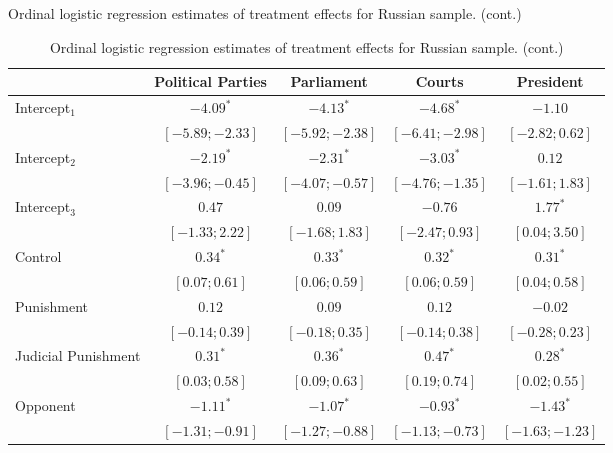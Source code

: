 \begin{table}[h]
\begin{center}
\caption
*
{Ordinal logistic regression estimates of treatment effects for Russian sample. (cont.)}
\caption{Ordinal logistic regression estimates of treatment effects for Russian sample. (cont.)}
\begin{threeparttable}
\begin{tabular}{l c c c c}
\hline
 & Political Parties & Parliament & Courts & President \\
\hline
Intercept$_1$            & $-4.09^{*}$       & $-4.13^{*}$       & $-4.68^{*}$       & $-1.10$           \\
                         & $ [-5.89; -2.33]$ & $ [-5.92; -2.38]$ & $ [-6.41; -2.98]$ & $ [-2.82;  0.62]$ \\
Intercept$_2$            & $-2.19^{*}$       & $-2.31^{*}$       & $-3.03^{*}$       & $0.12$            \\
                         & $ [-3.96; -0.45]$ & $ [-4.07; -0.57]$ & $ [-4.76; -1.35]$ & $ [-1.61;  1.83]$ \\
Intercept$_3$            & $0.47$            & $0.09$            & $-0.76$           & $1.77^{*}$        \\
                         & $ [-1.33;  2.22]$ & $ [-1.68;  1.83]$ & $ [-2.47;  0.93]$ & $ [ 0.04;  3.50]$ \\
Control                  & $0.34^{*}$        & $0.33^{*}$        & $0.32^{*}$        & $0.31^{*}$        \\
                         & $ [ 0.07;  0.61]$ & $ [ 0.06;  0.59]$ & $ [ 0.06;  0.59]$ & $ [ 0.04;  0.58]$ \\
Punishment               & $0.12$            & $0.09$            & $0.12$            & $-0.02$           \\
                         & $ [-0.14;  0.39]$ & $ [-0.18;  0.35]$ & $ [-0.14;  0.38]$ & $ [-0.28;  0.23]$ \\
Judicial Punishment      & $0.31^{*}$        & $0.36^{*}$        & $0.47^{*}$        & $0.28^{*}$        \\
                         & $ [ 0.03;  0.58]$ & $ [ 0.09;  0.63]$ & $ [ 0.19;  0.74]$ & $ [ 0.02;  0.55]$ \\
Opponent                 & $-1.11^{*}$       & $-1.07^{*}$       & $-0.93^{*}$       & $-1.43^{*}$       \\
                         & $ [-1.31; -0.91]$ & $ [-1.27; -0.88]$ & $ [-1.13; -0.73]$ & $ [-1.63; -1.23]$ \\

\end{tabular}
\end{threeparttable}
\end{center}
\end{table}

